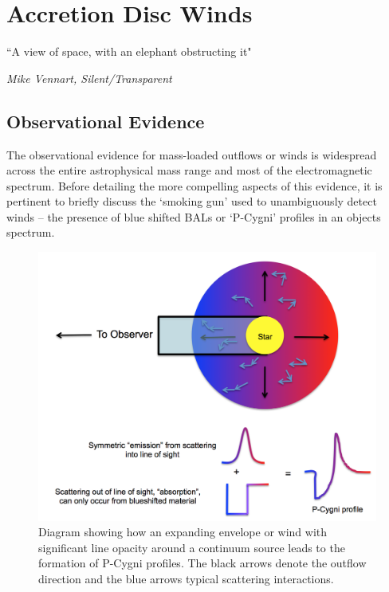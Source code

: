 \chapter{Accretion Disc Winds}
\label{sec:winds}

\epigraph{``A view of space, with an elephant obstructing it"}
{{\sl Mike Vennart, Silent/Transparent}}


\section{Observational Evidence}

The observational evidence for mass-loaded outflows or winds is 
widespread across the entire astrophysical mass range and most of
the electromagnetic spectrum. Before detailing the more compelling aspects
of this evidence, it is pertinent to briefly discuss the `smoking gun'
used to unambiguously detect winds -- the presence of blue shifted BALs
or `P-Cygni' profiles in an objects spectrum. 

\begin{figure}
\centering
\includegraphics[width=1.0\textwidth]{figures/02-outflows/pcyg.png}
\caption
{
Diagram showing how an expanding envelope or wind with significant line
opacity around a continuum source leads to the formation of P-Cygni profiles.
The black arrows denote the outflow direction and the blue arrows typical
scattering interactions.
} 
\label{fig:pcyg}
\end{figure}

